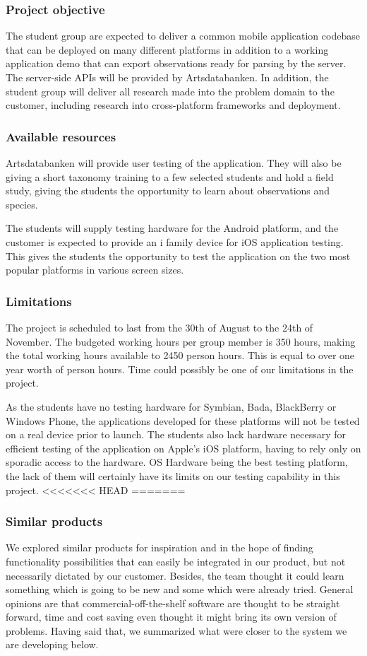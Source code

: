\subsubsection{Project objective}
The student group are expected to deliver a common mobile application codebase
that can be deployed on many different platforms in addition to a working
application demo that can export observations ready for parsing by the server.
The server-side APIs will be provided by Artsdatabanken. In addition, the
student group will deliver all research made into the problem domain to the
customer, including research into cross-platform frameworks and deployment.

\subsubsection{Available resources}
Artsdatabanken will provide user testing of the application. They will also be giving a short taxonomy training to a few selected students and hold a field study, giving the
students the opportunity to learn about observations and species.

The students will supply testing hardware for the Android platform, and the customer is expected to provide an i family device for iOS application testing. This gives the students the opportunity to test
the application on the two most popular platforms in various screen sizes.

\subsubsection{Limitations}
The project is scheduled to last from the 30th of August to the 24th of
November. The budgeted working hours per group member is 350 hours, making the
total working hours available to 2450  person hours. This is equal to over one
year worth of person hours. Time could possibly be one of our limitations in the project.

As the students have no testing hardware for Symbian, Bada, BlackBerry or
Windows Phone, the applications developed for these platforms will not be
tested on a real device prior to launch. The students also lack hardware
necessary for efficient testing of the application on Apple's iOS platform, having to rely only on sporadic
access to the hardware. OS Hardware being the best testing platform, the lack of them will certainly have its limits on our testing capability in this project.
<<<<<<< HEAD
=======

\subsubsection{Similar products}
We explored similar products for inspiration and in the hope of finding
functionality possibilities that can easily be integrated in our product, but
not necessarily dictated by our customer. Besides, the team thought it could
learn something which is going to be new and some which were already tried.
General opinions are that commercial-off-the-shelf software are thought to be
straight forward, time and cost saving even thought it might bring its own
version of problems\cite{similarproduct:introdn}. Having said that, we
summarized what were closer to the system we are developing below.

